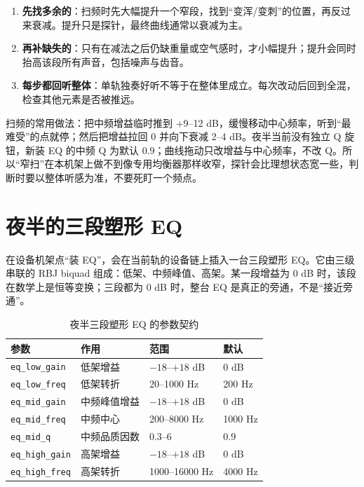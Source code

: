 \begin{enumerate}
  \item \textbf{先找多余的}：扫频时先大幅提升一个窄段，找到“变浑/变刺”的位置，再反过来衰减。提升只是探针，最终曲线通常以衰减为主。
  \item \textbf{再补缺失的}：只有在减法之后仍缺重量或空气感时，才小幅提升；提升会同时抬高该段所有声音，包括噪声与齿音。
  \item \textbf{每步都回听整体}：单轨独奏好听不等于在整体里成立。每次改动后回到全混，检查其他元素是否被推远。
\end{enumerate}

扫频的常用做法：把中频增益临时推到 +9–12 dB，缓慢移动中心频率，听到“最难受”的点就停；然后把增益拉回 0 并向下衰减 2–4 dB。夜半当前没有独立 Q 旋钮，新装 EQ 的中频 Q 为默认 0.9；曲线拖动只改增益与中心频率，不改 Q。所以“窄扫”在本机架上做不到像专用均衡器那样收窄，探针会比理想状态宽一些，判断时要以整体听感为准，不要死盯一个频点。

\section{夜半的三段塑形 EQ}

在设备机架点“装 EQ”，会在当前轨的设备链上插入一台三段塑形 EQ。它由三级串联的 RBJ biquad 组成：低架、中频峰值、高架。某一段增益为 0 dB 时，该段在数学上是恒等变换；三段都为 0 dB 时，整台 EQ 是真正的旁通，不是“接近旁通”。

\begin{table}[htbp]
\centering
\small
\begin{tabular}{@{}llll@{}}
\hline
参数 & 作用 & 范围 & 默认 \\
\hline
\texttt{eq\_low\_gain} & 低架增益 & $-18$–$+18$ dB & 0 dB \\
\texttt{eq\_low\_freq} & 低架转折 & 20–1000 Hz & 200 Hz \\
\texttt{eq\_mid\_gain} & 中频峰值增益 & $-18$–$+18$ dB & 0 dB \\
\texttt{eq\_mid\_freq} & 中频中心 & 200–8000 Hz & 1000 Hz \\
\texttt{eq\_mid\_q} & 中频品质因数 & 0.3–6 & 0.9 \\
\texttt{eq\_high\_gain} & 高架增益 & $-18$–$+18$ dB & 0 dB \\
\texttt{eq\_high\_freq} & 高架转折 & 1000–16000 Hz & 4000 Hz \\
\hline
\end{tabular}
\caption{夜半三段塑形 EQ 的参数契约}
\label{tab:eq-params}
\end{table}

